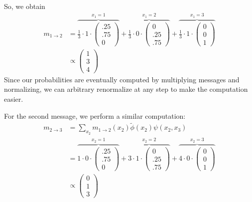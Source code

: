 \documentclass[12pt]{article}
\begin{document}
{\begin{enumerate}[(a)]
\begin{itemize}
            \end{itemize}
            So, we obtain
            \begin{align*}
                m_{1 \to 2} &=
                \overbrace{\frac{1}{3} \cdot 1 \cdot \begin{pmatrix} .25 \\ .75 \\ 0 \end{pmatrix}}^{x_1 = 1} +
                \overbrace{\frac{1}{3} \cdot 0 \cdot \begin{pmatrix} 0 \\ .25 \\ .75 \end{pmatrix}}^{x_1 = 2} +
                \overbrace{\frac{1}{3} \cdot 1 \cdot \begin{pmatrix} 0 \\ 0 \\ 1 \end{pmatrix}}^{x_1 = 3} \\
                &\propto \begin{pmatrix} 1 \\ 3 \\ 4 \end{pmatrix}
            \end{align*}
            Since our probabilities are eventually computed by multiplying messages and normalizing,
            we can arbitrary renormalize at any step to make the computation easier.

            For the second message, we perform a similar computation:
            \begin{align*}
                m_{2 \to 3} &= 
                    \sum_{x_2} {m_{1 \to 2}(x_2) \tilde{\phi}(x_2)} \psi(x_2,x_3) \\
                &=
                    \overbrace{1 \cdot 0 \cdot \begin{pmatrix} .25 \\ .75 \\ 0 \end{pmatrix}}^{x_2 = 1} +
                    \overbrace{3 \cdot 1 \cdot \begin{pmatrix} 0 \\ .25 \\ .75 \end{pmatrix}}^{x_2 = 2} +
                    \overbrace{4 \cdot 0 \cdot \begin{pmatrix} 0 \\ 0 \\ 1 \end{pmatrix}}^{x_2 = 3} \\
                &\propto \begin{pmatrix} 0 \\ 1 \\ 3 \end{pmatrix}
            \end{align*}



\end{enumerate}}
\end{document}
